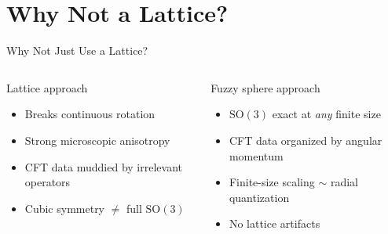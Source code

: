 \documentclass[aspectratio=169]{beamer}
\begin{document}
\section{Why Not a Lattice?}

\begin{frame}{Why Not Just Use a Lattice?}
  \begin{columns}
    \begin{alertblock}{Lattice approach}
      \begin{itemize}
        \item Breaks continuous rotation
        \item Strong microscopic anisotropy
        \item CFT data muddied by irrelevant operators
        \item Cubic symmetry $\neq$ full $\mathrm{SO}(3)$
      \end{itemize}
    \end{alertblock}

    \begin{exampleblock}{Fuzzy sphere approach}
      \begin{itemize}
        \item $\mathrm{SO}(3)$ exact at \emph{any} finite size
        \item CFT data organized by angular momentum
        \item Finite-size scaling $\sim$ radial quantization
        \item No lattice artifacts
      \end{itemize}
    \end{exampleblock}
  \end{columns}

  \vspace{1em}
  \begin{center}
\end{center}
\end{frame}
\end{document}
